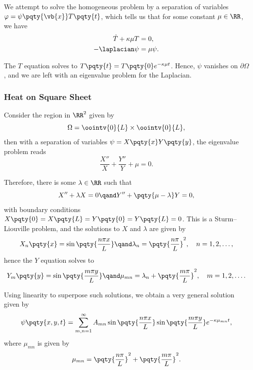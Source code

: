 {We attempt to solve the homogeneous problem by a separation of variables \(\varphi = \psi\pqty{\vb{x}} T\pqty{t}\), which tells us that for some constant \(\mu \in \RR\), we have
\begin{subequations}
    \begin{align}
        \dot{T} + \kappa \mu T &= 0, \\
        -\laplacian \psi &= \mu \psi.
    \end{align}
\end{subequations}

The \(T\) equation solves to \(T\pqty{t} = T\pqty{0} e^{- \kappa \mu t}\). Hence, \(\psi\) vanishes on \(\partial \Omega\), and we are left with an eigenvalue problem for the Laplacian.

\subsubsection{Heat on Square Sheet}

Consider the region in \(\RR^2\) given by
\begin{equation}
    \Omega = \oointv{0}{L} \times \oointv{0}{L},
\end{equation}
then with a separation of variables \(\psi = X\pqty{x} Y\pqty{y}\), the eigenvalue problem reads
\begin{equation}
    \frac{X''}{X} + \frac{Y''}{Y} + \mu = 0.
\end{equation}

Therefore, there is some \(\lambda \in \RR\) such that
\begin{equation}
    X'' + \lambda X = 0 \qand Y'' + \pqty{\mu - \lambda} Y = 0,
\end{equation}
with boundary conditions \(X\pqty{0} = X\pqty{L} = Y\pqty{0} = Y\pqty{L} = 0\). This is a Sturm--Liouville problem, and the solutions to \(X\) and \(\lambda\) are given by
\begin{equation}
    X_n \pqty{x} = \sin \pqty{\frac{n \pi x}{L}} \qand \lambda_n = \pqty{\frac{n \pi}{L}}^2, \quad n = 1, 2, \ldots,
\end{equation}
hence the \(Y\) equation solves to
\begin{equation}
    Y_m \pqty{y} = \sin \pqty{\frac{m \pi y}{L}} \qand \mu_{mn} = \lambda_n + \pqty{\frac{m \pi}{L}}^2, \quad m = 1, 2, \ldots.
\end{equation}

Using linearity to superpose such solutions, we obtain a very general solution given by
\begin{equation}
    \psi\pqty{x, y, t} = \sum_{m, n = 1}^{\infty} A_{mn} \sin \pqty{\frac{n \pi x}{L}} \sin \pqty{\frac{m \pi y}{L}} e^{- \kappa \mu_{mn} t},
\end{equation}
where \(\mu_{mn}\) is given by
\begin{equation}
    \mu_{mn} = \pqty{\frac{n \pi}{L}}^2 + \pqty{\frac{m \pi}{L}}^2.
\end{equation}

}
